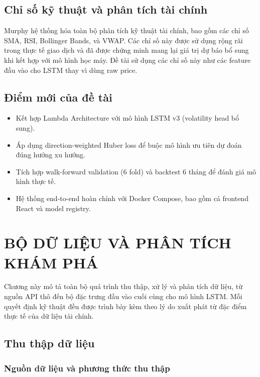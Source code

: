 \documentclass[12pt, a4paper]{report}
\begin{document}
\section{Chỉ số kỹ thuật và phân tích tài chính}

Murphy \cite{ref6} hệ thống hóa toàn bộ phân tích kỹ thuật tài chính, bao gồm các chỉ số SMA, RSI, Bollinger Bands, và VWAP. Các chỉ số này được sử dụng rộng rãi trong thực tế giao dịch và đã được chứng minh mang lại giá trị dự báo bổ sung khi kết hợp với mô hình học máy. Đề tài sử dụng các chỉ số này như các feature đầu vào cho LSTM thay vì dùng raw price.

\section{Điểm mới của đề tài}

\begin{itemize}
  \item Kết hợp Lambda Architecture với mô hình LSTM v3 (volatility head bổ sung).
  \item Áp dụng direction-weighted Huber loss để buộc mô hình ưu tiên dự đoán đúng hướng xu hướng.
  \item Tích hợp walk-forward validation (6 fold) và backtest 6 tháng để đánh giá mô hình thực tế.
  \item Hệ thống end-to-end hoàn chỉnh với Docker Compose, bao gồm cả frontend React và model registry.
\end{itemize}

\chapter{BỘ DỮ LIỆU VÀ PHÂN TÍCH KHÁM PHÁ}

Chương này mô tả toàn bộ quá trình thu thập, xử lý và phân tích dữ liệu, từ nguồn API
thô đến bộ đặc trưng đầu vào cuối cùng cho mô hình LSTM. Mỗi quyết định kỹ thuật
đều được trình bày kèm theo lý do xuất phát từ đặc điểm thực tế của dữ liệu tài chính.

\section{Thu thập dữ liệu}

\subsection{Nguồn dữ liệu và phương thức thu thập}
\end{document}
